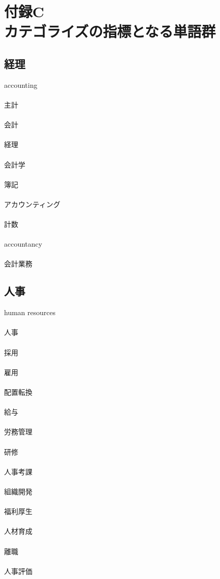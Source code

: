 \chapter*{付録C\\カテゴライズの指標となる単語群}

\setlength{\parindent}{0pt}

\section*{経理}
accounting
\\\\
主計
\\\\
会計
\\\\
経理
\\\\
会計学
\\\\
簿記
\\\\
アカウンティング
\\\\
計数
\\\\
accountancy
\\\\
会計業務

\section*{人事}
human resources
\\\\
人事
\\\\
採用
\\\\
雇用
\\\\
配置転換
\\\\
給与
\\\\
労務管理
\\\\
研修
\\\\
人事考課
\\\\
組織開発
\\\\
福利厚生
\\\\
人材育成
\\\\
離職
\\\\
人事評価

